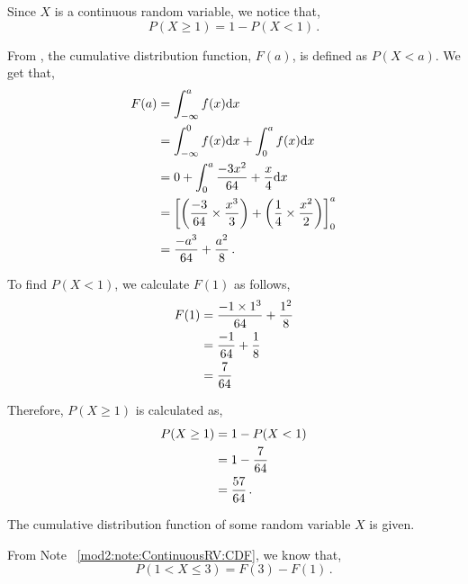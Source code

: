 \begin{subquestions}
\begin{subsubquestions}
Since $X$ is a continuous random variable, we notice that, 
\begin{equation}
	P(X \geq 1) = 1 - P(X < 1) \,.
\end{equation}

From , the cumulative distribution function, $F(a)$, is defined as $P(X<a)$.
We get that,
\begin{align}
		F(a) & = \int_{-\infty}^{a} f(x)\mathrm{d}x	\nonumber \\
			 & = \int_{-\infty}^{0} f(x)\mathrm{d}x + \int_{0}^{a} f(x)\mathrm{d}x \nonumber \\
		     & = 0 + \int_{0}^{a} \frac{-3x^2}{64}+\frac{x}{4} \mathrm{d}x \nonumber \\
		     & = \left[ \left(\frac{-3}{64} \times \frac{x^3}{3}\right)+\left(\frac{1}{4}\times \frac{x^2}{2}\right) \right]^{a}_{0} \nonumber \\
		     & = \frac{-a^3}{64} + \frac{a^2}{8} \,.
\end{align}

To find $P(X<1)$, we calculate $F(1)$ as follows,
\begin{align}
	F(1) & = \frac{-1 \times 1^3}{64} + \frac{1^2}{8} \nonumber \\
	     & = \frac{-1}{64} + \frac{1}{8} \nonumber \\
	     & = \frac{7}{64}
\end{align}

Therefore, $P(X \geq 1)$ is calculated as,
\begin{align}
	P(X \geq 1) & = 1 - P(X < 1) \nonumber \\
	            & = 1 - \frac{7}{64} \nonumber \\
	            & = \frac{57}{64} \,.
\end{align}

\end{subsubquestions}


\subquestion

The cumulative distribution function of some random variable $X$ is given.

\begin{subsubquestions}

\subsubquestion

From Note ~\ref{mod2:note:ContinuousRV:CDF}, we know that,
\begin{equation}
	P( 1 < X \leq 3) = F(3) - F(1) \,.
\end{equation}


\end{subsubquestions}
\end{subquestions}
